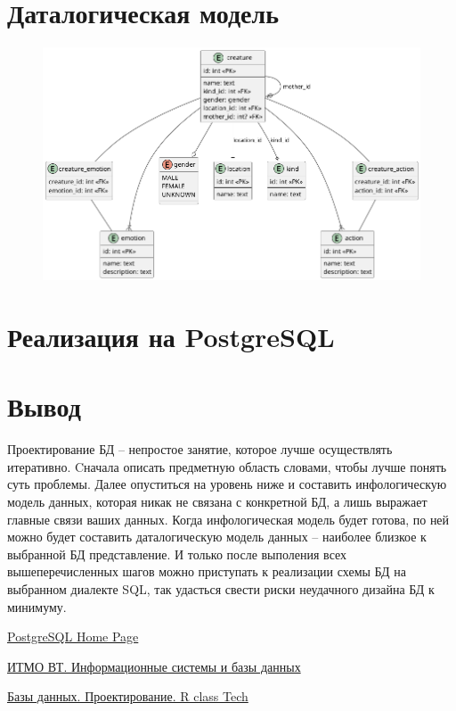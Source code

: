 \documentclass{article}
\begin{document}
\newpage

\section{Даталогическая модель}

\begin{figure}[th]
    \includegraphics[scale=0.5]{./low-er-diagram.png}
    \centering
\end{figure}

\section{Реализация на PostgreSQL}



\section{Вывод}

Проектирование БД -- непростое занятие, которое
лучше осуществлять итеративно. Cначала
описать предметную область словами, чтобы лучше
понять суть проблемы. Далее опуститься на уровень
ниже и составить инфологическую модель данных,
которая никак не связана с конкретной БД, а
лишь выражает главные связи ваших данных.
Когда инфологическая модель будет готова,
по ней можно будет составить даталогическую
модель данных -- наиболее близкое к выбранной
БД представление. И только после выполения всех
вышеперечисленных шагов можно приступать
к реализации схемы БД на выбранном диалекте SQL,
так удасться свести риски неудачного дизайна БД
к минимуму.

\begin{thebibliography}{9}
    \item \href{https://www.postgresql.org}{
        PostgreSQL Home Page}

    \item \href{https://se.ifmo.ru/documents/10180/733702/isbd-2021-2.6.pdf/e47a2e01-d445-e017-070f-a300ecdb71a8}{
        ИТМО ВТ. Информационные системы и базы данных}

    \item \href{https://youtu.be/HnRXzrg3Sd4?si=Il3rxvHIpw93Wx0J}{
        Базы данных. Проектирование. R class Tech}
\end{thebibliography}
\end{document}

